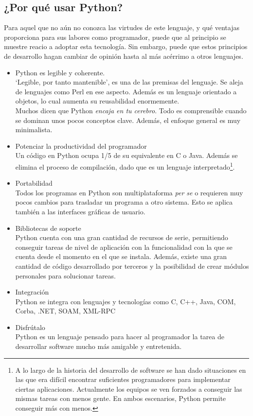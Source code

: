 \documentclass[12pt]{article} %
\begin{document}
\subsection{\large ¿Por qué usar Python?}
	Para aquel que no aún no conozca las virtudes de este lenguaje, y qué ventajas proporciona para sus labores como programador, puede que al principio se muestre reacio a adoptar esta tecnología. Sin embargo, puede que estos principios de desarrollo hagan cambiar de opinión hasta al más acérrimo a otros lenguajes.
	\begin{itemize}
		\item Python es legible y coherente.\\
			`Legible, por tanto mantenible', es una de las premisas del lenguaje. Se aleja de lenguajes como Perl en ese aspecto. Además es un lenguaje orientado a objetos, lo cual aumenta su reusabilidad enormemente.\\
			Muchos dicen que Python \textit{encaja en tu cerebro}. Todo es comprensible cuando se dominan unos pocos conceptos clave. Además, el enfoque general es muy minimalista.
		\item Potenciar la productividad del programador\\
			Un código en Python ocupa 1/5 de su equivalente en C o Java. Además se elimina el proceso de compilación, dado que es un lenguaje interpretado\footnote{A lo largo de la historia del desarrollo de software se han dado situaciones en las que era difícil encontrar suficientes programadores para implementar ciertas aplicaciones. Actualmente los equipos se ven forzados a conseguir las mismas tareas con menos gente. En ambos escenarios, Python permite conseguir más con menos.}.
		\item Portabilidad\\
			Todos los programas en Python son multiplataforma \textit{per se} o requieren muy pocos cambios para trasladar un programa a otro sistema. Esto se aplica también a las interfaces gráficas de usuario.
		\item Bibliotecas de soporte\\
			Python cuenta con una gran cantidad de recursos de serie, permitiendo conseguir tareas de nivel de aplicación con la funcionalidad con la que se cuenta desde el momento en el que se instala. Además, existe una gran cantidad de código desarrollado por terceros y la posibilidad de crear módulos personales para solucionar tareas.
		\item Integración\\
			Python se integra con lenguajes y tecnologías como C, C++, Java, COM, Corba, .NET, SOAM, XML-RPC
		\item Disfrútalo\\
			Python es un lenguaje pensado para hacer al programador la tarea de desarrollar software mucho más amigable y entretenida.
	\end{itemize}
		
\end{document}
